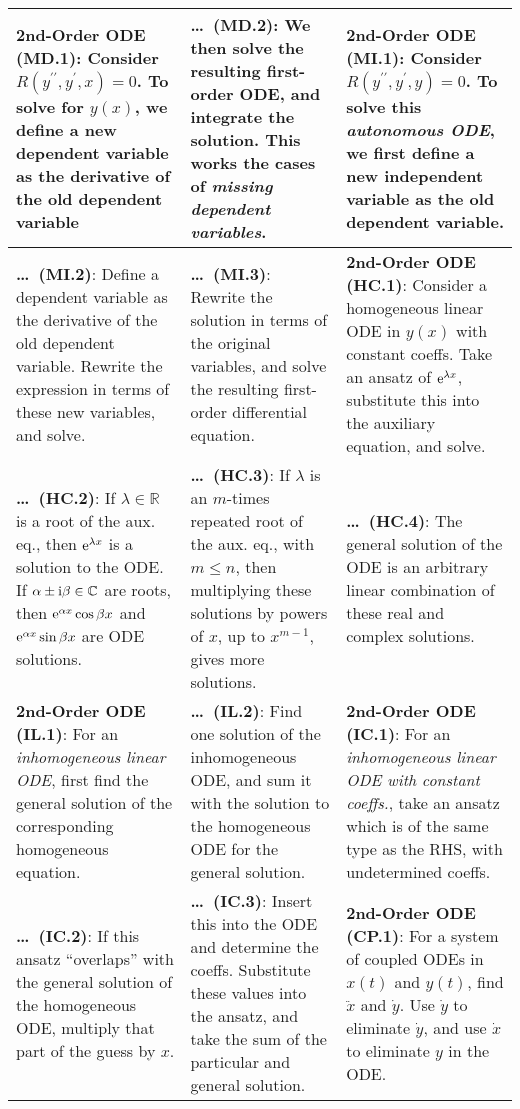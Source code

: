 \begin{tabular}{|m{.31\linewidth}|m{.31\linewidth}|m{.31\linewidth}|}
%
\hline
\textbf{2nd-Order ODE (MD.1)}: Consider $R(y^{\prime\prime},y^\prime,x)=0$. To
solve for $y(x)$, we define a new dependent variable as the derivative of the
old dependent variable &
%
\textbf{\ldots\ (MD.2)}: We then solve the resulting first-order ODE, and
integrate the solution. This works the cases of \emph{missing dependent
variables}. &
%
\textbf{2nd-Order ODE (MI.1)}: Consider $R(y^{\prime\prime},y^\prime,y)=0$. To
solve this \emph{autonomous ODE}, we first define a new independent variable as
the old dependent variable. \\
%
\hline
%
\textbf{\ldots\ (MI.2)}: Define a dependent variable as the derivative of the
old dependent variable. Rewrite the expression in terms of these new variables,
and solve. &
%
\textbf{\ldots\ (MI.3)}: Rewrite the solution in terms of the original
variables, and solve the resulting first-order differential equation. &
%
\textbf{2nd-Order ODE (HC.1)}: Consider a homogeneous linear ODE in $y(x)$ with
constant coeffs. Take an ansatz of $\mathrm{e}^{\lambda x}$, substitute this
into the auxiliary equation, and solve. \\
%
\hline
%
\textbf{\ldots\ (HC.2)}: If $\lambda\in\mathbb{R}$ is a root of the aux.  eq.,
then $\mathrm{e}^{\lambda x}$ is a solution to the ODE.  If
$\alpha\pm\mathrm{i}\beta\in\mathbb{C}$ are roots, then
$\mathrm{e}^{\alpha x}\cos\beta x$ and $\mathrm{e}^{\alpha x}\sin\beta x$
are ODE solutions. &
%
\textbf{\ldots\ (HC.3)}: If $\lambda$ is an $m$-times repeated root of the aux.
eq., with $m\leq n$, then multiplying these solutions by powers of $x$, up to
$x^{m-1}$, gives more solutions. &
%
\textbf{\ldots\ (HC.4)}: The general solution of the ODE is an arbitrary linear
combination of these real and complex solutions. \\
%
\hline
%
\textbf{2nd-Order ODE (IL.1)}: For an \emph{inhomogeneous linear ODE}, first
find the general solution of the corresponding homogeneous equation. &
%
\textbf{\ldots\ (IL.2)}: Find one solution of the inhomogeneous ODE, and
sum it with the solution to the homogeneous ODE for the general solution. &
%
\textbf{2nd-Order ODE (IC.1)}: For an \emph{inhomogeneous linear ODE with
constant coeffs.}, take an ansatz which is of the same type as the RHS, with
undetermined coeffs. \\
%
\hline
%
\textbf{\ldots\ (IC.2)}: If this ansatz ``overlaps'' with the general
solution of the homogeneous ODE, multiply that part of the guess by $x$. &
%
\textbf{\ldots\ (IC.3)}: Insert this into the ODE and determine the coeffs.
Substitute these values into the ansatz, and take the sum of the particular and
general solution. &
%
\textbf{2nd-Order ODE (CP.1)}: For a system of coupled ODEs in $x(t)$ and
$y(t)$, find $\ddot{x}$ and $\dot{y}$. Use $\dot{y}$ to eliminate $\dot{y}$, and
use $\dot{x}$ to eliminate $y$ in the ODE. \\
%
\hline
\end{tabular}

